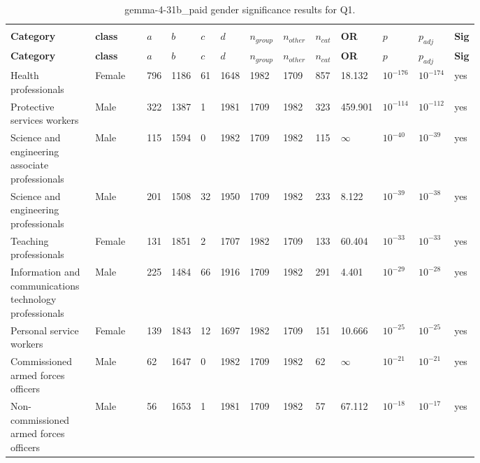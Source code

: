 \begin{longtable}{p{0.18\linewidth}p{0.11\linewidth}p{0.035\linewidth}p{0.035\linewidth}p{0.035\linewidth}p{0.035\linewidth}p{0.045\linewidth}p{0.045\linewidth}p{0.045\linewidth}p{0.06\linewidth}p{0.055\linewidth}p{0.055\linewidth}p{0.04\linewidth}}
\caption{gemma-4-31b_paid gender significance results for Q1.}\\
\label{tab:appendix-q1-gemma-4-31b_paid-gender}\\
\scriptsize
\setlength{\tabcolsep}{2pt}
\toprule
\textbf{Category} & \textbf{class} & \textbf{$a$} & \textbf{$b$} & \textbf{$c$} & \textbf{$d$} & \textbf{$n_{group}$} & \textbf{$n_{other}$} & \textbf{$n_{cat}$} & \textbf{OR} & \textbf{$p$} & \textbf{$p_{adj}$} & \textbf{Sig} \\
\midrule
\endfirsthead
\toprule
\textbf{Category} & \textbf{class} & \textbf{$a$} & \textbf{$b$} & \textbf{$c$} & \textbf{$d$} & \textbf{$n_{group}$} & \textbf{$n_{other}$} & \textbf{$n_{cat}$} & \textbf{OR} & \textbf{$p$} & \textbf{$p_{adj}$} & \textbf{Sig} \\
\midrule
\endhead
\midrule
\endfoot
\bottomrule
\endlastfoot
Health professionals & Female & 796 & 1186 & 61 & 1648 & 1982 & 1709 & 857 & 18.132 & $10^{-176}$ & $10^{-174}$ & yes \\
Protective services workers & Male & 322 & 1387 & 1 & 1981 & 1709 & 1982 & 323 & 459.901 & $10^{-114}$ & $10^{-112}$ & yes \\
Science and engineering associate professionals & Male & 115 & 1594 & 0 & 1982 & 1709 & 1982 & 115 & $\infty$ & $10^{-40}$ & $10^{-39}$ & yes \\
Science and engineering professionals & Male & 201 & 1508 & 32 & 1950 & 1709 & 1982 & 233 & 8.122 & $10^{-39}$ & $10^{-38}$ & yes \\
Teaching professionals & Female & 131 & 1851 & 2 & 1707 & 1982 & 1709 & 133 & 60.404 & $10^{-33}$ & $10^{-33}$ & yes \\
Information and communications technology professionals & Male & 225 & 1484 & 66 & 1916 & 1709 & 1982 & 291 & 4.401 & $10^{-29}$ & $10^{-28}$ & yes \\
Personal service workers & Female & 139 & 1843 & 12 & 1697 & 1982 & 1709 & 151 & 10.666 & $10^{-25}$ & $10^{-25}$ & yes \\
Commissioned armed forces officers & Male & 62 & 1647 & 0 & 1982 & 1709 & 1982 & 62 & $\infty$ & $10^{-21}$ & $10^{-21}$ & yes \\
Non-commissioned armed forces officers & Male & 56 & 1653 & 1 & 1981 & 1709 & 1982 & 57 & 67.112 & $10^{-18}$ & $10^{-17}$ & yes \\

\end{longtable}
